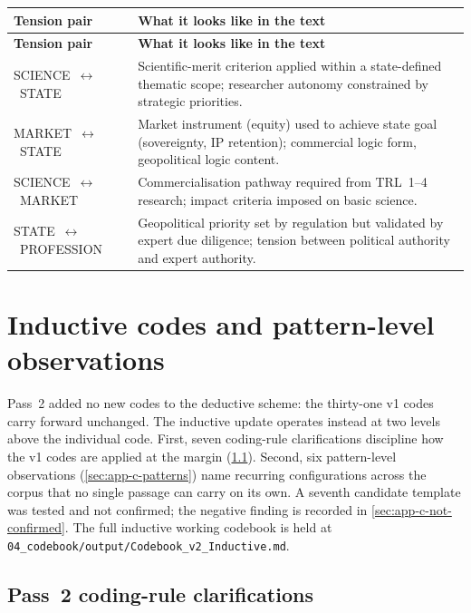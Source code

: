 \begin{longtable}{@{} p{3.0cm} p{10.0cm} @{}}
\toprule
\textbf{Tension pair} & \textbf{What it looks like in the text} \\
\midrule
\endfirsthead
\toprule
\textbf{Tension pair} & \textbf{What it looks like in the text} \\
\midrule
\endhead
\bottomrule
\endfoot
SCIENCE~$\leftrightarrow$~STATE & Scientific-merit criterion applied within a state-defined thematic scope; researcher autonomy constrained by strategic priorities. \\
MARKET~$\leftrightarrow$~STATE & Market instrument (equity) used to achieve state goal (sovereignty, IP retention); commercial logic form, geopolitical logic content. \\
SCIENCE~$\leftrightarrow$~MARKET & Commercialisation pathway required from TRL~1--4 research; impact criteria imposed on basic science. \\
STATE~$\leftrightarrow$~PROFESSION & Geopolitical priority set by regulation but validated by expert due diligence; tension between political authority and expert authority. \\
\end{longtable}

\chapter{Inductive codes and pattern-level observations}
\label{app:codebook-inductive}

Pass~2 added no new codes to the deductive scheme: the thirty-one v1
codes carry forward unchanged. The inductive update operates instead at
two levels above the individual code. First, seven coding-rule
clarifications discipline how the v1 codes are applied at the margin
(\cref{sec:app-c-rules}). Second, six pattern-level observations
(\cref{sec:app-c-patterns}) name recurring configurations across the
corpus that no single passage can carry on its own. A seventh candidate
template was tested and not confirmed; the negative finding is recorded
in \cref{sec:app-c-not-confirmed}. The full inductive working codebook
is held at \texttt{04\_codebook/output/Codebook\_v2\_Inductive.md}.

\section{Pass~2 coding-rule clarifications}
\label{sec:app-c-rules}

